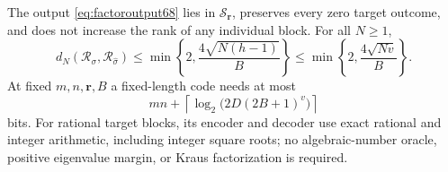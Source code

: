 \begin{theorem}\label{thm:factorcode68}
The output \eqref{eq:factoroutput68} lies in
$\mathcal S_{\boldsymbol r}$, preserves every zero target outcome,
and does not increase the rank of any individual block. For all
$N\ge1$,
\begin{equation}\label{eq:factorerror68}
 d_N(\mathcal R_\sigma,\mathcal R_{\widehat\sigma})
 \le\min\left\{2,\frac{4\sqrt{N(h-1)}}B\right\}
 \le\min\left\{2,\frac{4\sqrt{Nv}}B\right\}.
\end{equation}
At fixed $m,n,\boldsymbol r,B$ a fixed-length code needs at most
\begin{equation}\label{eq:factorbits68}
 mn+\left\lceil\log_2\bigl(2D(2B+1)^v\bigr)\right\rceil
\end{equation}
bits. For rational target blocks, its encoder and decoder use exact
rational and integer arithmetic, including integer square roots; no
algebraic-number oracle, positive eigenvalue margin, or Kraus
factorization is required.
\end{theorem}
